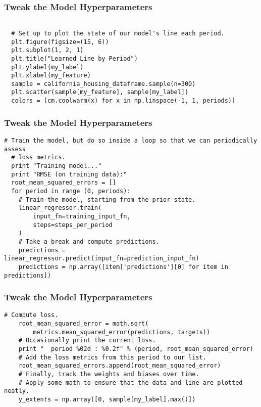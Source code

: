 \begin{frame}[fragile]\frametitle{Tweak the Model Hyperparameters}
\begin{lstlisting}

  # Set up to plot the state of our model's line each period.
  plt.figure(figsize=(15, 6))
  plt.subplot(1, 2, 1)
  plt.title("Learned Line by Period")
  plt.ylabel(my_label)
  plt.xlabel(my_feature)
  sample = california_housing_dataframe.sample(n=300)
  plt.scatter(sample[my_feature], sample[my_label])
  colors = [cm.coolwarm(x) for x in np.linspace(-1, 1, periods)]
\end{lstlisting}
\end{frame}


\begin{frame}[fragile]\frametitle{Tweak the Model Hyperparameters}
\begin{lstlisting}
# Train the model, but do so inside a loop so that we can periodically assess
  # loss metrics.
  print "Training model..."
  print "RMSE (on training data):"
  root_mean_squared_errors = []
  for period in range (0, periods):
    # Train the model, starting from the prior state.
    linear_regressor.train(
        input_fn=training_input_fn,
        steps=steps_per_period
    )
    # Take a break and compute predictions.
    predictions = linear_regressor.predict(input_fn=prediction_input_fn)
    predictions = np.array([item['predictions'][0] for item in predictions])
\end{lstlisting}
\end{frame}

\begin{frame}[fragile]\frametitle{Tweak the Model Hyperparameters}
\begin{lstlisting}
# Compute loss.
    root_mean_squared_error = math.sqrt(
        metrics.mean_squared_error(predictions, targets))
    # Occasionally print the current loss.
    print "  period %02d : %0.2f" % (period, root_mean_squared_error)
    # Add the loss metrics from this period to our list.
    root_mean_squared_errors.append(root_mean_squared_error)
    # Finally, track the weights and biases over time.
    # Apply some math to ensure that the data and line are plotted neatly.
    y_extents = np.array([0, sample[my_label].max()])
\end{lstlisting}
\end{frame}

